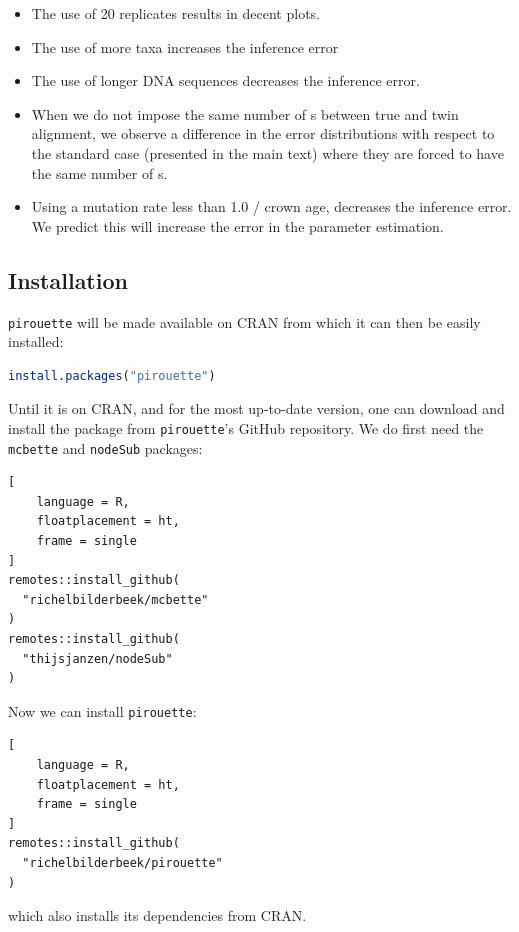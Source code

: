 \begin{itemize}
  \item{
    The use of 20 replicates results in decent plots.
  }
  \item{
    The use of more taxa increases the inference error
  }
  \item{
    The use of longer DNA sequences decreases the inference error.
  }
  \item{
    When we do not impose the same number of s 
    between true and twin alignment, we observe a difference in the error 
    distributions with respect to the standard case (presented in the main 
    text) where they are forced to have the same number of s.
  }
  \item{
    Using a mutation rate less than 1.0 / crown age, decreases the
    inference error. We predict this will increase the error in the parameter
    estimation.
  }
\end{itemize}

\subsection{Installation}
\label{subsec:installation}

\verb;pirouette; will be made available on CRAN from which 
it can then be easily installed:
\begin{lstlisting}[language=R, floatplacement=ht, frame=single]
install.packages("pirouette")
\end{lstlisting}

Until it is on CRAN, and for the most up-to-date version, 
one can download and install the package from \verb;pirouette;'s GitHub 
repository. We do first need the \verb;mcbette; and \verb;nodeSub; packages:
\begin{lstlisting}[
    language = R,
    floatplacement = ht,
    frame = single
]
remotes::install_github(
  "richelbilderbeek/mcbette"
)
remotes::install_github(
  "thijsjanzen/nodeSub"
)
\end{lstlisting}

Now we can install \verb;pirouette;:
\begin{lstlisting}[
    language = R,
    floatplacement = ht,
    frame = single
]
remotes::install_github(
  "richelbilderbeek/pirouette"
)
\end{lstlisting}
which also installs its dependencies from CRAN.

